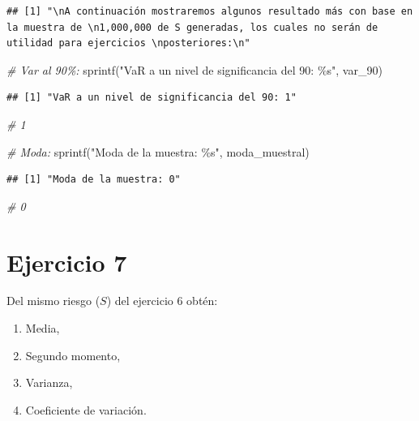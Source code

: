 \documentclass[
]{article}
\newenvironment{Shaded}{\begin{snugshade}}{\end{snugshade}}
\newcommand{\CommentTok}[1]{\textcolor[rgb]{0.56,0.35,0.01}{\textit{#1}}}
\newcommand{\FunctionTok}[1]{\textcolor[rgb]{0.00,0.00,0.00}{#1}}
\newcommand{\NormalTok}[1]{#1}
\newcommand{\StringTok}[1]{\textcolor[rgb]{0.31,0.60,0.02}{#1}}
\begin{document}
\begin{verbatim}
## [1] "\nA continuación mostraremos algunos resultado más con base en la muestra de \n1,000,000 de S generadas, los cuales no serán de utilidad para ejercicios \nposteriores:\n"
\end{verbatim}

\begin{Shaded}
\begin{Highlighting}[]
\CommentTok{\# Var al 90\%:}
\FunctionTok{sprintf}\NormalTok{(}\StringTok{"VaR a un nivel de significancia del 90: \%s"}\NormalTok{, var\_90)}
\end{Highlighting}
\end{Shaded}

\begin{verbatim}
## [1] "VaR a un nivel de significancia del 90: 1"
\end{verbatim}

\begin{Shaded}
\begin{Highlighting}[]
\CommentTok{\# 1}

\CommentTok{\# Moda:}
\FunctionTok{sprintf}\NormalTok{(}\StringTok{"Moda de la muestra: \%s"}\NormalTok{, moda\_muestral)}
\end{Highlighting}
\end{Shaded}

\begin{verbatim}
## [1] "Moda de la muestra: 0"
\end{verbatim}

\begin{Shaded}
\begin{Highlighting}[]
\CommentTok{\# 0}
\end{Highlighting}
\end{Shaded}

\hypertarget{ejercicio-7}{%
\section{Ejercicio 7}\label{ejercicio-7}}

Del mismo riesgo (\(S\)) del ejercicio 6 obtén:

\begin{enumerate}[label=(\alph*)]
\item Media,
\item Segundo momento,
\item Varianza,
\item Coeficiente de variación.
\end{enumerate}
\end{document}
